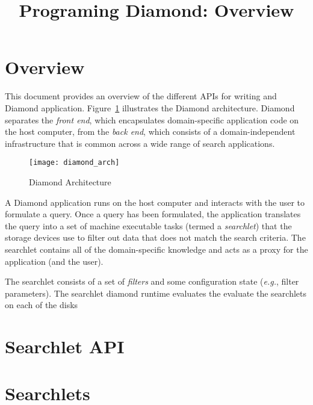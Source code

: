 
\usepackage{times}
\usepackage{mathptm}

\newcommand{\rw}[1]{{\em #1}}

\title{Programing Diamond: Overview }
\author{
}



\maketitle


\section{Overview}
\label{overview}

This document provides an overview of the different APIs for
writing and Diamond application.  
Figure~\ref{fig:arch} illustrates the Diamond
architecture.  Diamond separates the \emph{front end}, which encapsulates
domain-specific application code on the host computer, from the \emph{back
end}, which consists of a domain-independent infrastructure that is
common across a wide range of search applications.


\begin{figure}[tbp]
\texttt{[image: diamond\_arch]}
\caption{Diamond Architecture}
\label{fig:arch}
\end{figure}

A Diamond application runs on the host computer and interacts with
the user to formulate a query.  Once a query has been formulated, the
application translates the query into a set of machine executable tasks
(termed a \emph{searchlet}) that the storage devices use to
filter out data that does not match the search criteria.  The searchlet
contains all of the domain-specific knowledge and acts as a proxy
for the application (and the user).
                                                                                
The searchlet consists of a set of \emph{filters} and some
configuration state (\emph{e.g.}, filter parameters).  The searchlet
diamond runtime evaluates the  evaluate the searchlets on each of the disks

\section{Searchlet API}



\section{Searchlets}
\label{searchlets}

